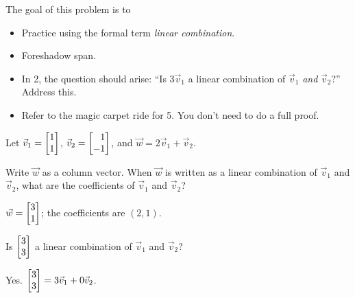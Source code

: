 \begin{slide}

	\question
	\label{ProbSkewBasis}
	\begin{annotation}
		\begin{goals}

			The goal of this problem is to
			\begin{itemize}
				\item Practice using the formal term \emph{linear combination}.
				\item Foreshadow span.
			\end{itemize}
		\end{goals}

		\begin{notes}
			\begin{itemize}
				\item In 2, the question should arise: ``Is $3\vec v_1$
					a linear combination of $\vec v_1$ \emph{and}
					$\vec v_2$?'' Address this.
				\item Refer to the magic carpet ride for 5. You don't
					need to do a full proof.
			\end{itemize}
		\end{notes}
	\end{annotation}
	Let $\vec v_1=\mat{1\\1}$, $\vec v_2=\mat{1\\-1}$, and $\vec w=2\vec v_1+\vec v_2$.
	\begin{parts}
		\item Write $\vec w$ as a column vector. When $\vec w$ is written as a
			linear combination of $\vec v_1$ and $\vec v_2$, what are the
			coefficients of $\vec v_1$ and $\vec v_2$?
			\begin{solution}
				$\vec w=\mat{3\\1}$; the coefficients are $(2,1)$.
			\end{solution}
		\item Is $\mat{3\\3}$ a linear combination of $\vec v_1$ and $\vec v_2$?
			\begin{solution}[inline]
				Yes. $\mat{3\\3}=3\vec v_1+0\vec v_2$.
			\end{solution}


\end{parts}
\end{slide}
